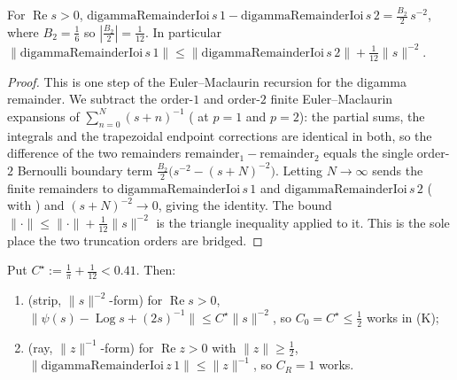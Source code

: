 \begin{lemma}
\label{lem:le_digamma_recurrence}
\leanok
For $\operatorname{Re}s>0$, $\mathrm{digammaRemainderIoi}\,s\,1-\mathrm{digammaRemainderIoi}\,s\,2
=\tfrac{B_2}{2}\,s^{-2}$, where $B_2=\tfrac16$ so $|\tfrac{B_2}{2}|=\tfrac1{12}$. In
particular $\|\mathrm{digammaRemainderIoi}\,s\,1\|\le\|\mathrm{digammaRemainderIoi}\,s\,2\|
+\tfrac1{12}\|s\|^{-2}$.
\end{lemma}

\begin{proof}
\leanok
This is one step of the Euler–Maclaurin recursion for the digamma remainder. We subtract the
order-$1$ and order-$2$ finite
Euler–Maclaurin expansions of $\sum_{n=0}^{N}(s+n)^{-1}$
( at $p=1$ and $p=2$): the partial sums, the integrals and
the trapezoidal endpoint corrections are identical in both, so the difference of the two
remainders $\mathrm{remainder}_1-\mathrm{remainder}_2$ equals the single order-$2$ Bernoulli
boundary term $\tfrac{B_2}{2}\bigl(s^{-2}-(s+N)^{-2}\bigr)$. Letting $N\to\infty$ sends the
finite remainders to $\mathrm{digammaRemainderIoi}\,s\,1$ and
$\mathrm{digammaRemainderIoi}\,s\,2$ (
with ) and $(s+N)^{-2}\to0$,
giving the identity. The bound $\|\cdot\|\le\|\cdot\|+\tfrac1{12}\|s\|^{-2}$ is the triangle
inequality applied to it. This is the sole place the two truncation orders are bridged.
\end{proof}

\begin{lemma}
\label{lem:le_digamma_const}
\leanok
{}
Put $C^{\star}:=\tfrac1\pi+\tfrac1{12}<0.41$. Then:
\begin{enumerate}
  \item (strip, $\|s\|^{-2}$-form) for $\operatorname{Re}s>0$,
  $\|\psi(s)-\operatorname{Log}s+(2s)^{-1}\|\le C^{\star}\|s\|^{-2}$, so $C_0=C^{\star}\le\tfrac12$
  works in (K);
  \item (ray, $\|z\|^{-1}$-form) for $\operatorname{Re}z>0$ with $\|z\|\ge\tfrac12$,
  $\|\mathrm{digammaRemainderIoi}\,z\,1\|\le\|z\|^{-1}$, so $C_R=1$ works.
\end{enumerate}
\end{lemma}

